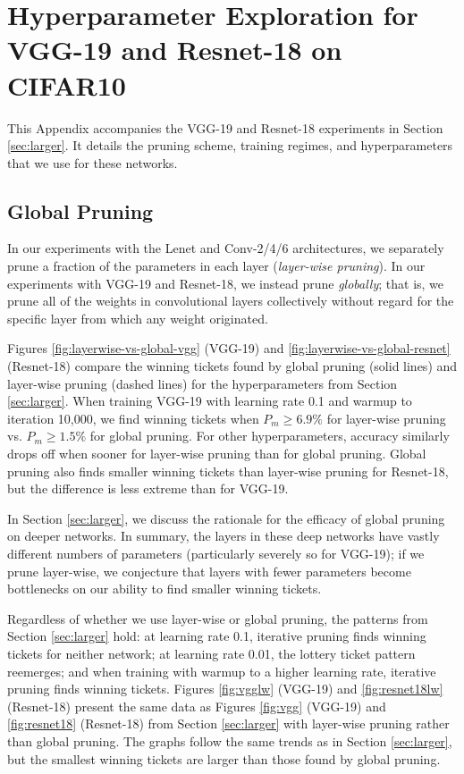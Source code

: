 \newpage
\section{Hyperparameter Exploration for VGG-19 and Resnet-18 on CIFAR10}
\label{app:resnet18}
\label{app:vgg}

This Appendix accompanies the VGG-19 and Resnet-18 experiments in Section \ref{sec:larger}. It details the pruning scheme, training regimes, and hyperparameters that we use for these networks.

\subsection{Global Pruning}
\label{app:layerwise-vs-global}

In our experiments with the Lenet and Conv-2/4/6 architectures, we separately prune a fraction of the parameters in each layer (\emph{layer-wise pruning}).
In our experiments with VGG-19 and Resnet-18, we instead prune \emph{globally};
that is, we prune all of the weights in convolutional layers collectively without regard for the specific layer from which any weight originated.

Figures \ref{fig:layerwise-vs-global-vgg} (VGG-19) and \ref{fig:layerwise-vs-global-resnet} (Resnet-18) compare the winning tickets found by global pruning (solid lines) and layer-wise pruning (dashed lines) for the hyperparameters from Section \ref{sec:larger}. When
training VGG-19 with learning rate 0.1 and warmup to iteration 10,000, we find winning tickets when $P_m \geq 6.9\%$  for layer-wise pruning vs. $P_m \geq 1.5\%$ for global pruning. For other hyperparameters, accuracy similarly drops off when sooner for layer-wise pruning than for global pruning. Global pruning also finds smaller winning tickets than layer-wise pruning for Resnet-18, but the difference is less extreme than for VGG-19.

In Section \ref{sec:larger}, we discuss the rationale for the efficacy of global pruning on deeper networks. In summary, the layers in these deep networks have vastly different numbers of parameters (particularly severely so for VGG-19); if we prune layer-wise, we conjecture that layers with fewer parameters become bottlenecks on our ability to find smaller winning tickets.

Regardless of whether we use layer-wise or global pruning, the patterns from Section \ref{sec:larger} hold: at learning rate 0.1, iterative pruning finds winning tickets for neither network; at learning rate 0.01, the lottery ticket pattern reemerges; and when training with warmup to a higher learning rate, iterative pruning finds winning tickets. Figures \ref{fig:vgglw} (VGG-19)  and \ref{fig:resnet18lw}  (Resnet-18) present the same data as Figures \ref{fig:vgg} (VGG-19) and \ref{fig:resnet18} (Resnet-18) from Section \ref{sec:larger} with layer-wise pruning rather than global pruning. The graphs follow the same trends as in Section \ref{sec:larger}, but the smallest winning tickets are larger than those found by global pruning.


